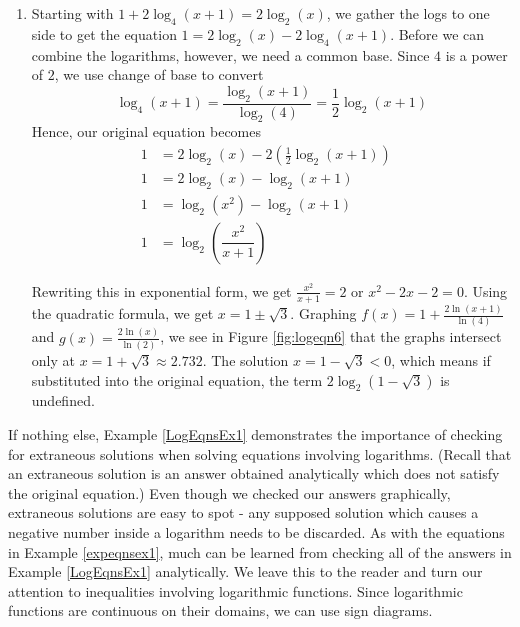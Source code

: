 {\begin{enumerate}
\item Starting with $1 + 2 \log_{4}(x+1) = 2 \log_{2}(x)$, we gather the logs to one side to get the equation $1 = 2 \log_{2}(x) - 2 \log_{4}(x+1)$.  Before we can combine the logarithms, however, we need a common base.  Since $4$ is a power of $2$, we use change of base to convert  
\[
\log_{4}(x+1) = \frac{\log_{2}(x+1)}{\log_{2}(4)} = \frac{1}{2} \log_{2}(x+1)
\] 
Hence, our original equation becomes  
\begin{align*}
1 & =  2 \log_{2}(x) - 2 \left(\frac{1}{2} \log_{2}(x+1)\right) \\
1 &=  2\log_{2}(x) - \log_{2}(x+1) \\
1 & = \log_{2}\left(x^2\right) - \log_{2}(x+1) \tag*{Power Rule} \\[3pt]
1 & =  \log_{2}\left( \dfrac{x^{2}}{x+1}\right) & \tag*{Quotient Rule}
\end{align*}

Rewriting this in exponential form, we get $ \frac{x^{2}}{x+1} = 2$ or $x^2 -2x-2 = 0$.  Using the quadratic formula, we get $x = 1 \pm \sqrt{3}$.  Graphing $f(x) = 1 + \frac{2\ln(x+1)}{\ln(4)}$ and $g(x) = \frac{2 \ln(x)}{\ln(2)}$, we see in Figure \ref{fig:logeqn6} that the graphs intersect only at $x = 1 + \sqrt{3} \approx 2.732$.  The solution $x = 1 - \sqrt{3} < 0$, which means if substituted into the original equation, the term $2 \log_{2}\left(1 - \sqrt{3}\right)$ is undefined.

{}

\end{enumerate}
}



\pagebreak

If nothing else,  Example \ref{LogEqnsEx1} demonstrates the importance of checking for extraneous solutions when solving equations involving logarithms.  (Recall that an extraneous solution is an answer obtained analytically which does not satisfy the original equation.) Even though we checked our answers graphically, extraneous solutions are easy to spot - any supposed solution which causes a negative number inside a logarithm needs to be discarded.  As with the equations in Example \ref{expeqnsex1}, much can be learned from checking all of the answers in Example \ref{LogEqnsEx1} analytically.  We leave this to the reader and turn our attention to inequalities involving logarithmic functions.  Since logarithmic functions are continuous on their domains, we can use sign diagrams.  

